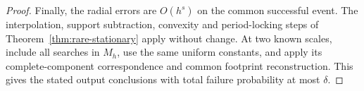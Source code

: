 \begin{proof}
Finally, the radial errors are $O(h^s)$ on the common successful event.
The interpolation, support subtraction, convexity and period-locking
steps of Theorem~\ref{thm:rare-stationary} apply without change. At
two known scales, include all searches in $M_h$, use the same uniform
constants, and apply its complete-component correspondence and common
footprint reconstruction. This gives the stated output conclusions
with total failure probability at most $\delta$.
\end{proof}
